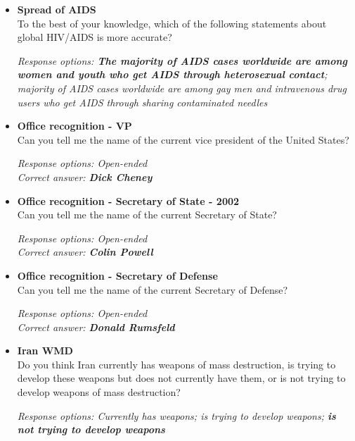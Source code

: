 \documentclass[12pt, letterpaper]{article}
\begin{document}
  \begin{itemize}
\item \textbf{Spread of AIDS}\\
To the best of your knowledge, which of the following statements about global HIV/AIDS is more accurate?

\textit{Response options: \textbf{The majority of AIDS cases worldwide are among women and youth who get AIDS through heterosexual contact}; majority of AIDS cases worldwide are among gay men and intravenous drug users who get AIDS through sharing contaminated needles}
\end{itemize}

  \begin{itemize}
\item \textbf{Office recognition - VP}\\
Can you tell me the name of the current vice president of the United States?

\textit{Response options: Open-ended} \\
\textit{Correct answer: \textbf{Dick Cheney}}
\end{itemize}

  \begin{itemize}
\item \textbf{Office recognition - Secretary of State - 2002}\\
Can you tell me the name of the current Secretary of State?

\textit{Response options: Open-ended} \\
\textit{Correct answer: \textbf{Colin Powell}}
\end{itemize}

  \begin{itemize}
\item \textbf{Office recognition - Secretary of Defense}\\
Can you tell me the name of the current Secretary of Defense?

\textit{Response options: Open-ended} \\
\textit{Correct answer: \textbf{Donald Rumsfeld}}
\end{itemize}

  \begin{itemize}
\item \textbf{Iran WMD}\\
Do you think Iran currently has weapons of mass destruction, is trying to develop these weapons but does not currently have them, or is not trying to develop weapons of mass destruction? 

\textit{Response options: Currently has weapons; is trying to develop weapons; \textbf{is not trying to develop weapons}} \\
\end{itemize}
\end{document}
